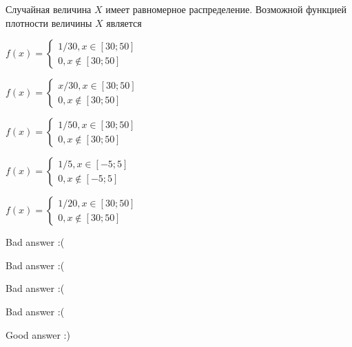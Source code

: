 
\begin{question}
Случайная величина \(X\) имеет равномерное распределение. Возможной
функцией плотности величины \(X\) является
\begin{answerlist}
  \item \(f(x) = \begin{cases} 1/30, x \in [30;50] \\ 0, x\notin [30;50] \end{cases}\)
  \item \(f(x) = \begin{cases} x/30, x \in [30;50] \\ 0, x\notin [30;50] \end{cases}\)
  \item \(f(x) = \begin{cases} 1/50, x \in [30;50] \\ 0, x\notin [30;50] \end{cases}\)
  \item \(f(x) = \begin{cases} 1/5, x \in [-5;5] \\ 0, x\notin [-5;5] \end{cases}\)
  \item \(f(x) = \begin{cases} 1/20, x \in [30;50] \\ 0, x\notin [30;50] \end{cases}\)
\end{answerlist}
\end{question}

\begin{solution}
\begin{answerlist}
  \item Bad answer :(
  \item Bad answer :(
  \item Bad answer :(
  \item Bad answer :(
  \item Good answer :)
\end{answerlist}
\end{solution}

